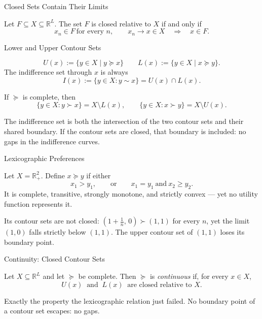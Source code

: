 \documentclass[11pt,aspectratio=169,c]{beamer}
\begin{document}
\begin{frame}{Closed Sets Contain Their Limits}
\begin{theorembox}
Let $F\subseteq X\subseteq\mathbb{R}^L$. The set $F$ is closed relative to
$X$ if and only if
\[
x_n\in F\ \text{for every }n,\qquad x_n\to x\in X
\quad\Longrightarrow\quad x\in F.
\]
\end{theorembox}

\end{frame}

\begin{frame}{Lower and Upper Contour Sets}
\setlength{\abovedisplayskip}{.3em}
\setlength{\belowdisplayskip}{.3em}
\begin{definitionbox}
\[
U(x) := \{ y \in X \mid y \succeq x \} \qquad L(x) := \{ y \in X \mid x \succeq y \}.
\]
The indifference set through $x$ is always
\[
I(x):=\{y\in X:y\sim x\}=U(x)\cap L(x).
\]
\end{definitionbox}

\begin{propositionbox}
If $\succeq$ is complete, then
\[
\{y\in X:y\succ x\}=X\setminus L(x),
\qquad
\{y\in X:x\succ y\}=X\setminus U(x).
\]
\end{propositionbox}

The indifference set is both the intersection of the two contour sets and
their shared boundary. If the contour sets are closed, that boundary is
included: no gaps in the indifference curves.
\end{frame}

\begin{frame}{Lexicographic Preferences}
\begin{definitionbox}
Let $X=\mathbb{R}_+^2$. Define $x\succeq y$ if either
\[
x_1>y_1,
\qquad\text{or}\qquad
x_1=y_1\ \text{and}\ x_2\geq y_2.
\]
It is complete, transitive, strongly monotone, and strictly convex --- yet no
utility function represents it.
\end{definitionbox}

Its contour sets are not closed: $(1+\tfrac1n,\,0)\succ(1,1)$ for every $n$, yet the
limit $(1,0)$ falls strictly below $(1,1)$. The upper contour set of
$(1,1)$ loses its boundary point.
\end{frame}

\begin{frame}{Continuity: Closed Contour Sets}
\begin{definitionbox}[Continuity]
Let $X\subseteq\mathbb{R}^L$ and let $\succeq$ be complete. Then $\succeq$ is
\emph{continuous} if, for every $x\in X$,
\[
U(x)\ \text{ and }\ L(x)\ \text{ are closed relative to }X.
\]
\end{definitionbox}

Exactly the property the lexicographic relation just failed. No boundary
point of a contour set escapes: no gaps.
\end{frame}
\end{document}
